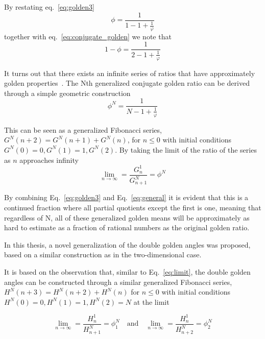By restating eq.~\ref{eq:golden3}
\begin{equation}
    \phi = \frac{1}{1 - 1 + \frac{1}{\varphi}}
\end{equation}
together with eq.~\ref{eq:conjugate_golden} we note that
\begin{equation}
    1 - \phi = \frac{1}{2 - 1 + \frac{1}{\varphi}}
\end{equation}

It turns out that there exists an infinite series of ratios that have approximately golden properties~\cite{Wundrak2015}. The Nth generalized conjugate golden ratio can be derived through a simple geometric construction
\begin{equation}
\label{eq:general}
    \phi^N = \frac{1}{N-1+\frac{1}{\varphi}}
\end{equation}

This can be seen as a generalized Fibonacci series, $G^N(n+2) = G^N(n+1) + G^N(n)$, for $n \leq 0$ with initial conditions $G^N(0) = 0, G^N(1) = 1, G^N(2)$. By taking the limit of the ratio of the series as $n$ approaches infinity
\begin{equation}
    \lim_{n\to\infty} = \frac{G_n^1}{G_{n+1}^N} = \phi^N
    \label{eq:limit}
\end{equation}

By combining Eq.~\ref{eq:golden3} and Eq.~\ref{eq:general} it is evident that this is a continued fraction where all partial quotients except the first is one, meaning that regardless of N, all of these generalized golden means will be approximately as hard to estimate as a fraction of rational numbers as the original golden ratio.

In this thesis, a novel generalization of the double golden angles was proposed, based on a similar construction as in the two-dimensional case.

It is based on the observation that, similar to Eq.~\ref{eq:limit}, the double golden angles can be constructed through a similar generalized Fibonacci series, $H^N(n+3) = H^N(n+2) + H^N(n)$ for $n \leq 0$ with initial conditions $H^N(0) = 0, H^N(1) = 1, H^N(2) = N$ at the limit

\begin{equation}
        \lim_{n\to\infty} = \frac{H_n^1}{H_{n+1}^N} = \phi^N_1 \quad \textrm{and} \quad \lim_{n\to\infty} = \frac{H_n^1}{H_{n+2}^N} = \phi^N_2
\end{equation}

